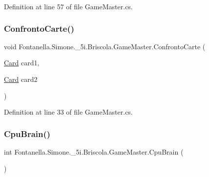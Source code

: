 Definition at line 57 of file Game\+Master.\+cs.

\hypertarget{class_fontanella_1_1_simone_1_1__5i_1_1_briscola_1_1_game_master_af7df7cf04ba55033629ead2c41723821}{}\label{class_fontanella_1_1_simone_1_1__5i_1_1_briscola_1_1_game_master_af7df7cf04ba55033629ead2c41723821} 
\subsubsection{\texorpdfstring{Confronto\+Carte()}{ConfrontoCarte()}}
{\footnotesize\ttfamily void Fontanella.\+Simone.\+\_\+5i.\+Briscola.\+Game\+Master.\+Confronto\+Carte (\begin{DoxyParamCaption}\item[{\hyperlink{class_fontanella_1_1_simone_1_1__5i_1_1_briscola_1_1_card}{Card}}]{card1,  }\item[{\hyperlink{class_fontanella_1_1_simone_1_1__5i_1_1_briscola_1_1_card}{Card}}]{card2 }\end{DoxyParamCaption})}



Definition at line 33 of file Game\+Master.\+cs.

\hypertarget{class_fontanella_1_1_simone_1_1__5i_1_1_briscola_1_1_game_master_affb9a5a6fa94208a622c976f9d3cf6bd}{}\label{class_fontanella_1_1_simone_1_1__5i_1_1_briscola_1_1_game_master_affb9a5a6fa94208a622c976f9d3cf6bd} 
\subsubsection{\texorpdfstring{Cpu\+Brain()}{CpuBrain()}}
{\footnotesize\ttfamily int Fontanella.\+Simone.\+\_\+5i.\+Briscola.\+Game\+Master.\+Cpu\+Brain (\begin{DoxyParamCaption}{ }\end{DoxyParamCaption})}



